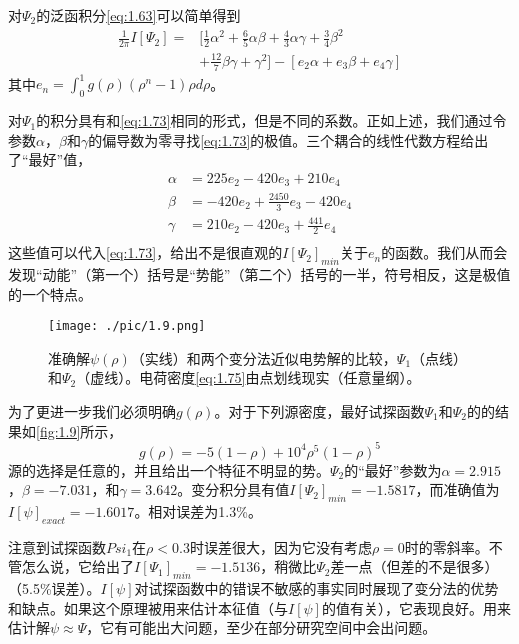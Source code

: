 \documentclass[12pt]{book}
\numberwithin{equation}{chapter}
\numberwithin{figure}{chapter}
\numberwithin{footnote}{page}
\begin{document}
对$\Psi_2$的泛函积分\autoref{eq:1.63}可以简单得到
\begin{equation}\label{eq:1.73}
    \begin{aligned}
        \frac{1}{2\pi}I[\Psi_2]=&[\frac{1}{2}\alpha^2+\frac{6}{5}\alpha\beta+\frac{4}{3}\alpha\gamma+\frac{3}{4}\beta^2\\
        &+\frac{12}{7}\beta\gamma+\gamma^2]-[e_2\alpha+e_3\beta+e_4\gamma]
    \end{aligned}
\end{equation}
其中$e_n=\int_0^1g(\rho)(\rho^n-1)\rho d\rho$。

对$\Psi_1$的积分具有和\autoref{eq:1.73}相同的形式，但是不同的系数。正如上述，我们通过令参数$\alpha$，$\beta$和$\gamma$的偏导数为零寻找\autoref{eq:1.73}的极值。三个耦合的线性代数方程给出了“最好”值，
\begin{equation}\label{eq:1.74}
    \begin{aligned}
        \alpha&=225e_2-420e_3+210e_4\\
        \beta&=-420e_2+\frac{2450}{3}e_3-420e_4\\
        \gamma&=210e_2-420e_3+\frac{441}{2}e_4\\
    \end{aligned}
\end{equation}
这些值可以代入\autoref{eq:1.73}，给出不是很直观的$I[\Psi_2]_{min}$关于$e_n$的函数。我们从而会发现“动能”（第一个）括号是“势能”（第二个）括号的一半，符号相反，这是极值的一个特点。

\begin{figure}[!ht]
    \centering
    \texttt{[image: ./pic/1.9.png]}
    \captionsetup{justification=raggedright, singlelinecheck=false}
    \caption{准确解$\psi(\rho)$（实线）和两个变分法近似电势解的比较，$\Psi_1$（点线）和$\Psi_2$（虚线）。电荷密度\autoref{eq:1.75}由点划线现实（任意量纲）。}
    \label{fig:1.9}
\end{figure}

为了更进一步我们必须明确$g(\rho)$。对于下列源密度，最好试探函数$\Psi_1$和$\Psi_2$的的结果如\autoref{fig:1.9}所示，
\begin{equation}\label{eq:1.75}
    g(\rho)=-5(1-\rho)+10^4\rho^5(1-\rho)^5
\end{equation}
源的选择是任意的，并且给出一个特征不明显的势。$\Psi_2$的“最好”参数为$\alpha=2.915$，$\beta=-7.031$，和$\gamma=3.642$。变分积分具有值$I[\Psi_2]_{min}=-1.5817$，而准确值为$I[\psi]_{exact}=-1.6017$。相对误差为1.3\%。

注意到试探函数$Psi_1$在$\rho<0.3$时误差很大，因为它没有考虑$\rho=0$时的零斜率。不管怎么说，它给出了$I[\Psi_1]_{min}=-1.5136$，稍微比$\Psi_2$差一点（但差的不是很多）（5.5\%误差）。$I[\psi]$对试探函数中的错误不敏感的事实同时展现了变分法的优势和缺点。如果这个原理被用来估计本征值（与$I[\psi]$的值有关），它表现良好。用来估计解$\psi\approx\Psi$，它有可能出大问题，至少在部分研究空间中会出问题。
\end{document}
